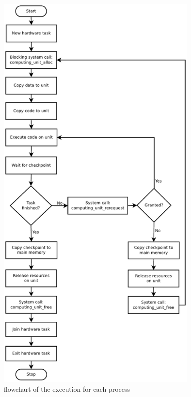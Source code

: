 \documentclass[a4paper,13pt]{article}
\begin{document}
    \begin{figure}[H]
        \centering
        \includegraphics[width=10cm]{eps/flowchar.eps}
        \caption{flowchart of the execution for each process}
    \end{figure}
\end{document}
